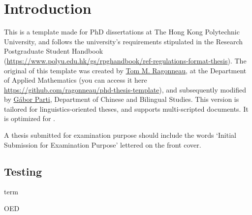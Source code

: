 \chapter{Introduction}
\label{sec:test}

This is a template made for PhD dissertations at The Hong Kong Polytechnic University, and follows the university's requirements stipulated in the Research Postgraduate Student Handbook (\url{https://www.polyu.edu.hk/gs/rpghandbook/ref-regulations-format-thesis}). The original of this  template was created by \href{https://github.com/ragonneau}{Tom M. Ragonneau}, at the Department of Applied Mathematics (you can access it here \url{https://github.com/ragonneau/phd-thesis-template}), and subsequently modified by \href{https://github.com/partigabor}{Gábor Parti}, Department of Chinese and Bilingual Studies. This version is tailored for linguistics-oriented theses, and supports multi-scripted documents. It is optimized for .

A thesis submitted for examination purpose should include the words ‘Initial Submission for Examination Purpose’ lettered on the front cover.

\section{Testing}

\gls{term}

\gls{OED}

\textcite{laufer_sino-iranica_1919}


